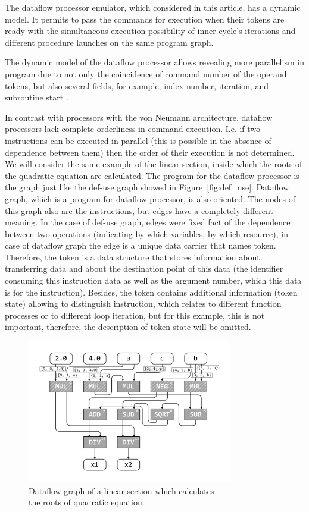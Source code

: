 \documentclass[
11pt,%
tightenlines,%
twoside,%
onecolumn,%
nofloats,%
nobibnotes,%
nofootinbib,%
superscriptaddress,%
noshowpacs,%
centertags]%
{revtex4}
\begin{document}
The dataflow processor emulator, which considered in this article, has a dynamic model.
It permits to pass the commands for execution when their tokens are ready with the simultaneous execution possibility of inner cycle’s iterations and different procedure launches on the same program graph.

The dynamic model of the dataflow processor allows revealing more parallelism in program due to not only the coincidence of command number of the operand tokens, but also several fields, for example, index number, iteration, and subroutine start \cite{Wiley}.

In contrast with processors with the von Neumann architecture, dataflow processors lack complete orderliness in command execution.
I.e. if two instructions can be executed in parallel (this is possible in the absence of dependence between them) then the order of their execution is not determined.
We will consider the same example of the linear section, inside which the roots of the quadratic equation are calculated.
The program for the dataflow processor is the graph just like the def-use graph showed in Figure~\ref{fig:def_use}.
Dataflow graph, which is a program for dataflow processor, is also oriented.
The nodes of this graph also are the instructions, but edges have a completely different meaning.
In the case of def-use graph, edges were fixed fact of the dependence between two operations (indicating by which variables, by which resource), in case of dataflow graph the edge is a unique data carrier that names token.
Therefore, the token is a data structure that stores information about transferring data and about the destination point of this data (the identifier consuming this instruction data as well as the argument number, which this data is for the instruction).
Besides, the token contains additional information (token state) allowing to distinguish instruction, which relates to different function processes or to different loop iteration, but for this example, this is not important, therefore, the description of token state will be omitted.

\begin{figure}[h]
\setcaptionmargin{5mm}
\onelinecaptionsfalse %
\includegraphics[width=0.80\textwidth]{pics/dataflow.pdf}
\caption{Dataflow graph of a linear section which calculates \\ the roots of quadratic equation.}\label{fig:dataflow}
\end{figure}
\end{document}
